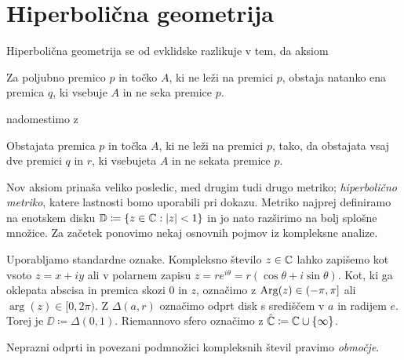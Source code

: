 \section{Hiperbolična geometrija} \label{sec:hipgeom}

Hiperbolična geometrija se od evklidske razlikuje v tem, da aksiom

\begin{aksiom}
    Za poljubno premico \(p\) in točko \(A\), ki ne leži na premici \(p\), obstaja natanko ena premica \(q\), ki vsebuje \(A\) in ne seka premice \(p\).
\end{aksiom}

\noindent nadomestimo z

\begin{aksiom}
    Obstajata premica \(p\) in točka \(A\), ki ne leži na premici \(p\), tako, da obstajata vsaj dve premici \(q\) in \(r\), ki vsebujeta \(A\) in ne sekata premice \(p\).
\end{aksiom}

\noindent Nov aksiom prinaša veliko posledic, med drugim tudi drugo metriko; \emph{hiperbolično metriko}, katere lastnosti bomo uporabili pri dokazu. Metriko najprej definiramo na enotskem disku \(\mathbb D \coloneq \left\{ z \in \mathbb C : |z| < 1 \right\}\) in jo nato razširimo na bolj splošne množice. Za začetek ponovimo nekaj osnovnih pojmov iz kompleksne analize.

Uporabljamo standardne oznake. Kompleksno število \(z \in \mathbb C\) lahko zapišemo kot vsoto \(z = x + i y\) ali v polarnem zapisu \(z = r e^{i \theta} = r (\cos \theta + i \sin \theta)\). Kot, ki ga oklepata abscisa in premica skozi \(0\) in \(z\), označimo z \(\operatorname{Arg} (z) \in (- \pi, \pi]\) ali \(\arg (z) \in [0, 2 \pi)\). Z \(\Delta (a, r)\) označimo odprt disk s središčem v \(a\) in radijem \(e\). Torej je \(\DD \coloneq \Delta (0, 1)\). Riemannovo sfero označimo z \(\hat{\mathbb C} \coloneq \mathbb C \cup \{\infty\}\).


\begin{definicija}
    Neprazni odprti in povezani podmnožici kompleksnih števil pravimo \emph{območje}.
\end{definicija}

